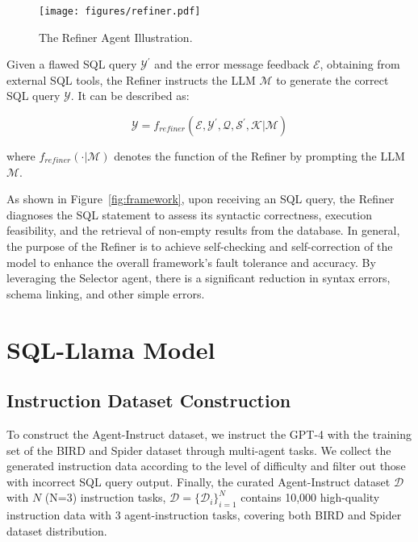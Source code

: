 \begin{figure}[t]
    \centering
    \texttt{[image: figures/refiner.pdf]}
    \caption{The Refiner Agent Illustration.}
    \label{fig:refiner}
\end{figure}

Given a flawed SQL query $\mathcal{Y}^{'}$ and the error message feedback $\mathcal{E}$, obtaining from external SQL tools, the Refiner instructs the LLM $\mathcal{M}$ to generate the correct SQL query $\mathcal{Y}$.
It can be described as:

\begin{equation}
\mathcal{Y} = f_{refiner}( \mathcal{E}, \mathcal{Y}^{'}, \mathcal{Q}, \mathcal{S}^{'}, \mathcal{K} | \mathcal{M})
\label{eq:refiner}
\end{equation}

where $f_{refiner}( \cdot | \mathcal{M})$ denotes the function of the Refiner by prompting the LLM $\mathcal{M}$. 

As shown in Figure~\ref{fig:framework}, upon receiving an SQL query, the Refiner diagnoses the SQL statement to assess its syntactic correctness, execution feasibility, and the retrieval of non-empty results from the database. 
In general, the purpose of the Refiner is to achieve self-checking and self-correction of the model to enhance the overall framework's fault tolerance and accuracy.
By leveraging the Selector agent, there is a significant reduction in syntax errors, schema linking, and other simple errors. 

\section{SQL-Llama Model}

\subsection{Instruction Dataset Construction}

To construct the Agent-Instruct dataset, we instruct the GPT-4 with the training set of the BIRD and Spider dataset through multi-agent tasks. 
We collect the generated instruction data according to the level of difficulty and filter out those with incorrect SQL query output.
Finally, the curated Agent-Instruct dataset $\mathcal{D}$ with $N$ (N=3) instruction tasks, $\mathcal{D} = \{\mathcal{D}_{i}\}_{i=1}^{N}$ contains 10,000 high-quality instruction data with 3 agent-instruction tasks, covering both BIRD and Spider dataset distribution. 


